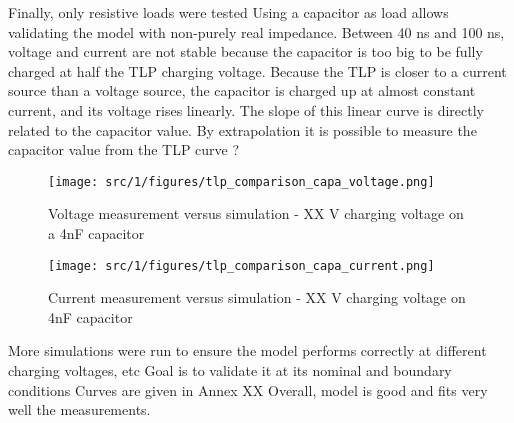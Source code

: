 Finally, only resistive loads were tested
Using a capacitor as load allows validating the model with non-purely real impedance.
Between 40 ns and 100 ns, voltage and current are not stable because the capacitor is too big to be fully charged at half the TLP charging voltage.
Because the TLP is closer to a current source than a voltage source, the capacitor is charged up at almost constant current, and its voltage rises linearly.
The slope of this linear curve is directly related to the capacitor value.
By extrapolation it is possible to measure the capacitor value from the TLP curve ?

\begin{figure}[!h]
  \centering
  \texttt{[image: src/1/figures/tlp\_comparison\_capa\_voltage.png]}
  \caption{Voltage measurement versus simulation - XX V charging voltage on a 4nF capacitor}
  \label{fig:comparison-tlp-capa-v}
\end{figure}

\begin{figure}[!h]
  \centering
  \texttt{[image: src/1/figures/tlp\_comparison\_capa\_current.png]}
  \caption{Current measurement versus simulation - XX V charging voltage on 4nF capacitor}
  \label{fig:comparison-tlp-capa-i}
\end{figure}

More simulations were run to ensure the model performs correctly at different charging voltages, etc
Goal is to validate it at its nominal and boundary conditions
Curves are given in Annex XX
Overall, model is good and fits very well the measurements.
